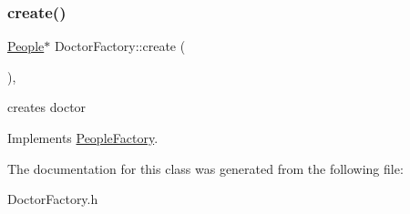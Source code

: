 \subsubsection{\texorpdfstring{create()}{create()}}
{\footnotesize\ttfamily \hyperlink{classPeople}{People}$\ast$ Doctor\+Factory\+::create (\begin{DoxyParamCaption}{ }\end{DoxyParamCaption})\hspace{0.3cm}{\ttfamily [inline]}, {\ttfamily [virtual]}}

creates doctor 

Implements \hyperlink{classPeopleFactory}{People\+Factory}.



The documentation for this class was generated from the following file\+:\begin{DoxyCompactItemize}
\item 
Doctor\+Factory.\+h\end{DoxyCompactItemize}
